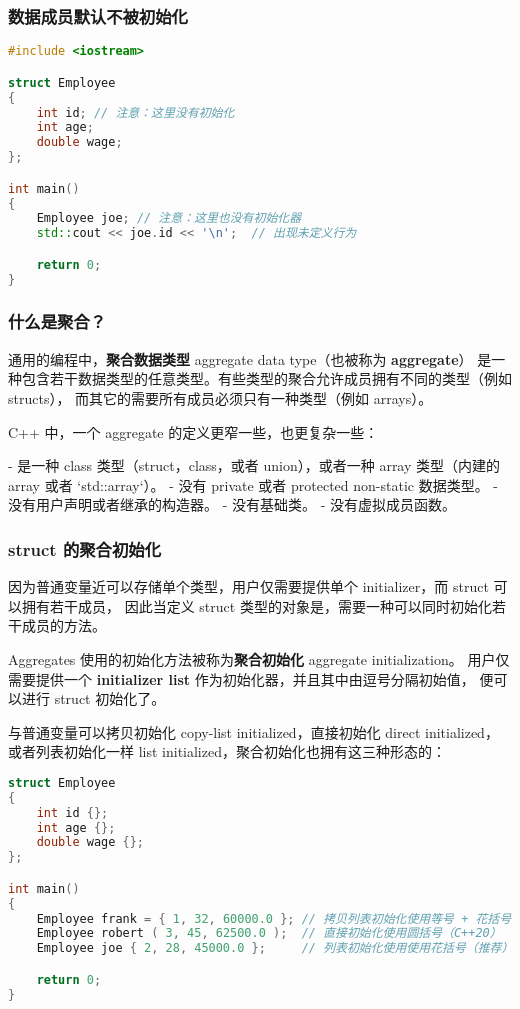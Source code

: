 \documentclass[../../LearnCpp.tex]{subfiles}
\begin{document}

\subsubsection*{数据成员默认不被初始化}

\begin{lstlisting}[language=C++]
#include <iostream>

struct Employee
{
    int id; // 注意：这里没有初始化
    int age;
    double wage;
};

int main()
{
    Employee joe; // 注意：这里也没有初始化器
    std::cout << joe.id << '\n';  // 出现未定义行为

    return 0;
}
\end{lstlisting}

\subsubsection*{什么是聚合？}

通用的编程中，\textbf{聚合数据类型} aggregate data type（也被称为 \textbf{aggregate}）
是一种包含若干数据类型的任意类型。有些类型的聚合允许成员拥有不同的类型（例如 structs），
而其它的需要所有成员必须只有一种类型（例如 arrays）。

C++ 中，一个 aggregate 的定义更窄一些，也更复杂一些：

- 是一种 class 类型（struct，class，或者 union），或者一种 array 类型（内建的 array 或者 `std::array`）。
- 没有 private 或者 protected non-static 数据类型。
- 没有用户声明或者继承的构造器。
- 没有基础类。
- 没有虚拟成员函数。

\subsubsection*{struct 的聚合初始化}

因为普通变量近可以存储单个类型，用户仅需要提供单个 initializer，而 struct 可以拥有若干成员，
因此当定义 struct 类型的对象是，需要一种可以同时初始化若干成员的方法。

Aggregates 使用的初始化方法被称为\textbf{聚合初始化} aggregate initialization。
用户仅需要提供一个 \textbf{initializer list} 作为初始化器，并且其中由逗号分隔初始值，
便可以进行 struct 初始化了。

与普通变量可以拷贝初始化 copy-list initialized，直接初始化 direct initialized，
或者列表初始化一样 list initialized，聚合初始化也拥有这三种形态的：

\begin{lstlisting}[language=C++]
struct Employee
{
    int id {};
    int age {};
    double wage {};
};

int main()
{
    Employee frank = { 1, 32, 60000.0 }; // 拷贝列表初始化使用等号 + 花括号
    Employee robert ( 3, 45, 62500.0 );  // 直接初始化使用圆括号（C++20）
    Employee joe { 2, 28, 45000.0 };     // 列表初始化使用使用花括号（推荐）

    return 0;
}
\end{lstlisting}
\end{document}

